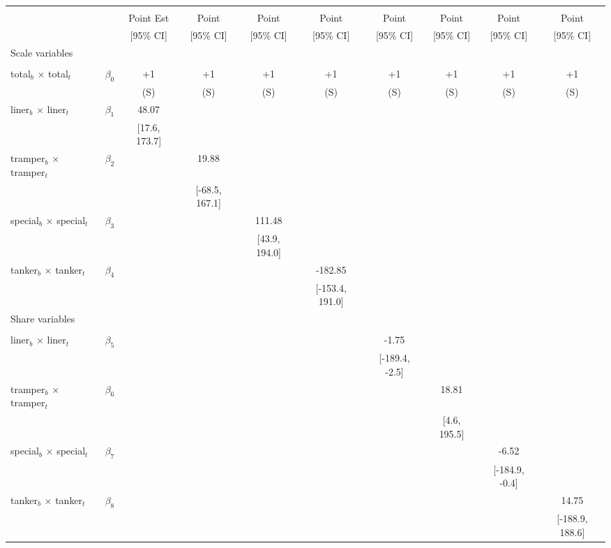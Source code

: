 \begin{tabular}{@{\extracolsep{5pt}}lccccccccc}
\toprule 
 &  &  &  &  &  &  &  &  &  \\
 &  & Point Est & Point & Point & Point & Point & Point & Point & Point \\
 &  & [95\% CI] & [95\% CI] & [95\% CI] & [95\% CI] & [95\% CI] & [95\% CI] & [95\% CI] & [95\% CI] \\
\midrule 
Scale variables &  &  &  &  &  &  &  \\
 &  &  &  &  &  &  &  &  \\
total$_{b}$ $\times$ total$_{t}$ & $\beta_0$ & +1 & +1 & +1 & +1 & +1 & +1 & +1 & +1 \\
 &  & (S) & (S) & (S) & (S) & (S) & (S) & (S) & (S) \\
liner$_{b}$ $\times$ liner$_{t}$ & $\beta_1$ & 48.07 &  &  &  &  &  &  &  \\
 &  & [17.6, 173.7] &  &  &  &  &  &  &  \\
tramper$_{b}$ $\times$ tramper$_{t}$ & $\beta_2$ &  & 19.88 &  &  &  &  &  &  \\
 &  &  & [-68.5, 167.1] &  &  &  &  &  &  \\
special$_{b}$ $\times$ special$_{t}$ & $\beta_3$ &  &  & 111.48 &  &  &  &  &  \\
 &  &  &  & [43.9, 194.0] &  &  &  &  &  \\
tanker$_{b}$ $\times$ tanker$_{t}$ & $\beta_4$ &  &  &  & -182.85 &  &  &  &  \\
 &  &  &  &  & [-153.4, 191.0] &  &  &  &  \\
Share variables &  &  &  &  &  &  &  &  &  \\
 &  &  &  &  &  &  &  &  &  \\
liner$_{b}$ $\times$ liner$_{t}$ & $\beta_5$ &  &  &  &  & -1.75 &  &  &  \\
 &  &  &  &  &  & [-189.4, -2.5] &  &  &  \\
tramper$_{b}$ $\times$ tramper$_{t}$ & $\beta_6$ &  &  &  &  &  & 18.81 &  &  \\
 &  &  &  &  &  &  & [4.6, 195.5] &  &  \\
special$_{b}$ $\times$ special$_{t}$ & $\beta_7$ &  &  &  &  &  &  & -6.52 &  \\
 &  &  &  &  &  &  &  & [-184.9, -0.4] &  \\
tanker$_{b}$ $\times$ tanker$_{t}$ & $\beta_8$ &  &  &  &  &  &  &  & 14.75 \\
 &  &  &  &  &  &  &  &  & [-188.9, 188.6] \\

\end{tabular}
